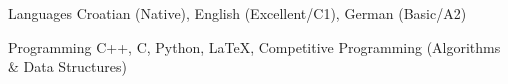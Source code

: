 
\begin{cvskills}
  \cvskill
    {Languages} %
    {Croatian (Native), English (Excellent/C1), German (Basic/A2)} %

  \cvskill
    {Programming} %
    {C++, C, Python, LaTeX, Competitive Programming (Algorithms \& Data Structures)} %
    
\end{cvskills}